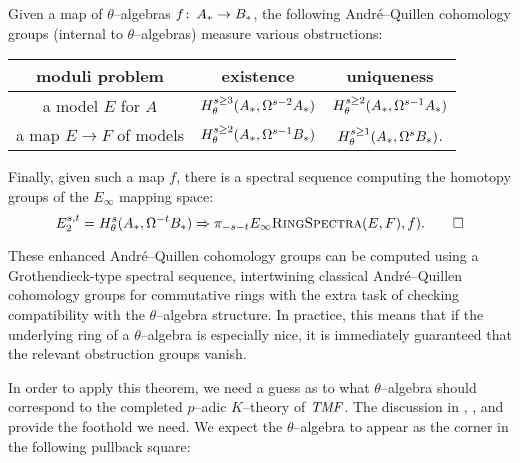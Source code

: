 \begin{theorem}
Given a map of $\theta$--algebras $f\colon\thinspace A_* \to B_*$, the following Andr\'e--Quillen cohomology groups (internal to $\theta$--algebras) measure various obstructions:
\begin{center}
\begin{tabular}{@{}ccc@{}} \toprule
moduli problem & existence & uniqueness \\
\midrule
a model $E$ for $A$ & $H^{s \ge 3}_\theta(A_*, \Omega^{s-2} A_*)$ & $H^{s \ge 2}_\theta(A_*, \Omega^{s-1} A_*)$ \\
a map $E \to F$ of models & $H^{s \ge 2}_\theta(A_*, \Omega^{s-1} B_*)$ & $H^{s \ge 1}_\theta(A_*, \Omega^s B_*)$. \\
 \bottomrule
\end{tabular}
\end{center}
Finally, given such a map $f$, there is a spectral sequence computing the homotopy groups of the $E_\infty$ mapping space: \[E_2^{s, t} = H^s_\theta(A_*, \Omega^{-t} B_*) \Rightarrow \pi_{-s-t} E_\infty\normalfont\textsc{RingSpectra}(E, F), f). \qed\]
\end{theorem}

\begin{remark}
These enhanced Andr\'e--Quillen cohomology groups can be computed using a Grothendieck-type spectral sequence, intertwining classical Andr\'e--Quillen cohomology groups for commutative rings with the extra task of checking compatibility with the $\theta$--algebra structure.  In practice, this means that if the underlying ring of a $\theta$--algebra is especially nice, it is immediately guaranteed that the relevant obstruction groups vanish.
\end{remark}

In order to apply this theorem, we need a guess as to what $\theta$--algebra should correspond to the completed $p$--adic $K$--theory of $\mathit{TMF}$.  The discussion in , , and  provide the foothold we need.  We expect the $\theta$--algebra to appear as the corner in the following pullback square:

\begin{center}
\end{center}

